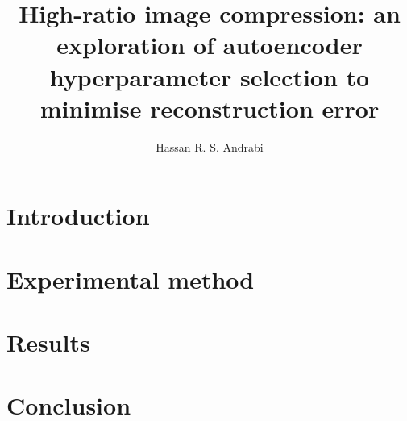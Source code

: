 \documentclass{article}
\title{High-ratio image compression: an exploration of autoencoder hyperparameter selection to minimise reconstruction error}
\author{Hassan R. S. Andrabi}
\date{}
\begin{document}
\maketitle

\begin{abstract}

\end{abstract}

\section{Introduction}\label{sec:introduction}


\section{Experimental method}\label{sec:experimental-method}


\section{Results}\label{sec:results}


\section{Conclusion}\label{sec:results}


\newpage



\end{document}
